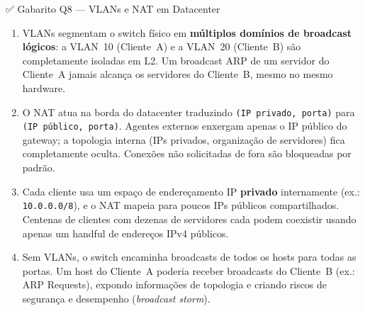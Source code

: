 \documentclass[11pt,a4paper]{article}
\begin{document}
\begin{gabaritocaixa}{✅ Gabarito Q8 --- VLANs e NAT em Datacenter}
\begin{enumerate}[label=(\alph*)]
    \item VLANs segmentam o switch físico em \textbf{múltiplos domínios de broadcast lógicos}: a VLAN~10 (Cliente~A) e a VLAN~20 (Cliente~B) são completamente isoladas em L2. Um broadcast ARP de um servidor do Cliente~A jamais alcança os servidores do Cliente~B, mesmo no mesmo hardware.
    \item O NAT atua na borda do datacenter traduzindo \texttt{(IP privado, porta)} para \texttt{(IP público, porta)}. Agentes externos enxergam apenas o IP público do gateway; a topologia interna (IPs privados, organização de servidores) fica completamente oculta. Conexões não solicitadas de fora são bloqueadas por padrão.
    \item Cada cliente usa um espaço de endereçamento IP \textbf{privado} internamente (ex.: \texttt{10.0.0.0/8}), e o NAT mapeia para poucos IPs públicos compartilhados. Centenas de clientes com dezenas de servidores cada podem coexistir usando apenas um handful de endereços IPv4 públicos.
    \item Sem VLANs, o switch encaminha broadcasts de todos os hosts para todas as portas. Um host do Cliente~A poderia receber broadcasts do Cliente~B (ex.: ARP Requests), expondo informações de topologia e criando riscos de segurança e desempenho (\textit{broadcast storm}).
\end{enumerate}
\end{gabaritocaixa}
\end{document}
